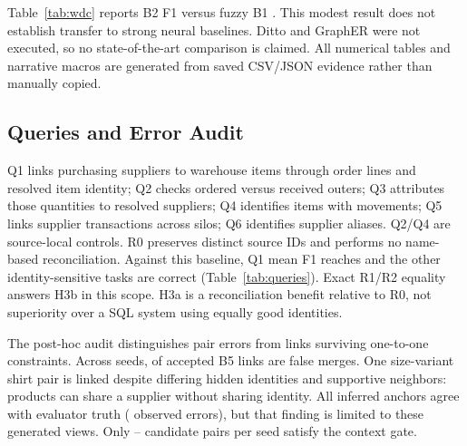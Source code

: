\documentclass[conference]{IEEEtran}
\begin{document}
Table~\ref{tab:wdc} reports B2 F1 \WdcBTwoFone{} versus fuzzy B1 \WdcBOneFone{}. This modest result does not establish transfer to strong neural baselines. Ditto and GraphER were not executed, so no state-of-the-art comparison is claimed. All numerical tables and narrative macros are generated from saved CSV/JSON evidence rather than manually copied.

\subsection{Queries and Error Audit}
\begin{table}[t]
\caption{Mean query-answer F1 across seeds and nonempty oracle denominators. R1 and R2 answer sets are identical for every seed/template.}
\label{tab:queries}
\centering
\end{table}
Q1 links purchasing suppliers to warehouse items through order lines and resolved item identity; Q2 checks ordered versus received outers; Q3 attributes those quantities to resolved suppliers; Q4 identifies items with movements; Q5 links supplier transactions across silos; Q6 identifies supplier aliases. Q2/Q4 are source-local controls. R0 preserves distinct source IDs and performs no name-based reconciliation. Against this baseline, Q1 mean F1 reaches \QoneFone{} and the other identity-sensitive tasks are correct (Table~\ref{tab:queries}). Exact R1/R2 equality answers H3b in this scope. H3a is a reconciliation benefit relative to R0, not superiority over a SQL system using equally good identities.

The post-hoc audit distinguishes pair errors from links surviving one-to-one constraints. Across seeds, \FalseMergeCount{} of \AcceptedCount{} accepted B5 links are false merges. One size-variant shirt pair is linked despite differing hidden identities and supportive neighbors: products can share a supplier without sharing identity. All \AnchorCount{} inferred anchors agree with evaluator truth (\AnchorErrors{} observed errors), but that finding is limited to these generated views. Only \SupportedMin{}--\SupportedMax{} candidate pairs per seed satisfy the context gate.
\end{document}

